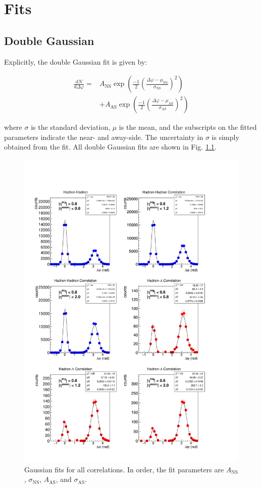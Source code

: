 \documentclass[../main.tex]{subfiles}
\begin{document}
\chapter{Fits}\label{appendix:a}
\section{Double Gaussian}
Explicitly, the double Gaussian fit is given by:

\begin{align}
    \frac{dN}{d\Delta\varphi} = &A_{\text{NS}} \exp{\left(\frac{-1}{2}\left(\frac{\Delta\varphi-\mu_{\text{NS}}}{\sigma_{\text{NS}}}\right)^2\right)} \\
    &+ A_{\text{AS}} \exp{\left(\frac{-1}{2}\left(\frac{\Delta\varphi-\mu_{\text{AS}}}{\sigma_{\text{AS}}}\right)^2\right)} 
\end{align}

where $\sigma$ is the standard deviation, $\mu$ is the mean, and the subscripts on the fitted parameters indicate the near- and away-side. The uncertainty in $\sigma$ is simply obtained from the fit. All double Gaussian fits are shown in Fig. \ref{fig:gaussian_fits}.

\begin{figure}
    \centering
    \includegraphics[scale=0.75]{appendix/figs/gaussian_fit.pdf}
    \caption{Gaussian fits for all correlations. In order, the fit parameters are $A_{\text{NS}}$, $\sigma_{\text{NS}}$, $A_{\text{AS}}$, and $\sigma_{\text{AS}}$.}
    \label{fig:gaussian_fits}
\end{figure}
\end{document}
